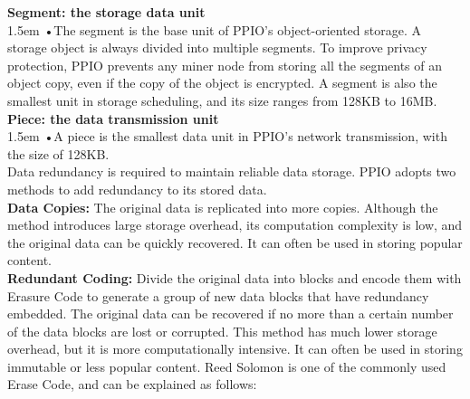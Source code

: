 \documentclass[10pt,a4paper]{article}
\begin{document}
\noindent   
{\bf Segment: the storage data unit}
\vspace{-0.8em}
\\

\hangindent 1.5em
\noindent   
•\quad The segment is the base unit of PPIO’s object-oriented storage. A storage object is always divided into multiple segments. To improve privacy protection, PPIO prevents any miner node from storing all the segments of an object copy, even if the copy of the object is encrypted. A segment is also the smallest unit in storage scheduling, and its size ranges from 128KB to 16MB.
\vspace{-0.6em}
\\

\noindent   
{\bf Piece: the data transmission unit}
\vspace{-0.6em}
\\

\hangindent 1.5em
\noindent   
•\quad  A piece is the smallest data unit in PPIO’s network transmission, with the size of 128KB.
\vspace{-0.5em}
\\

\noindent  
Data redundancy is required to maintain reliable data storage. PPIO adopts two methods to add redundancy to its stored data.
\vspace{-0.6em}
\\

\noindent   
 {\bf Data Copies:} The original data is replicated into more copies. Although the method introduces large storage overhead, its computation complexity is low, and the original data can be quickly recovered. It can often be used in storing popular content.
 \vspace{-0.5em}
\\

\noindent   
{\bf Redundant Coding:} Divide the original data into blocks and encode them with Erasure Code to generate a group of new data blocks that have redundancy embedded. The original data can be recovered if no more than a certain number of the data blocks are lost or corrupted. This method has much lower storage overhead, but it is more computationally intensive. It can often be used in storing immutable or less popular content. Reed Solomon \cite{article22} is one of the commonly used Erase Code, and can be explained as follows:
\vspace{-0.8em}
\\
\end{document}
